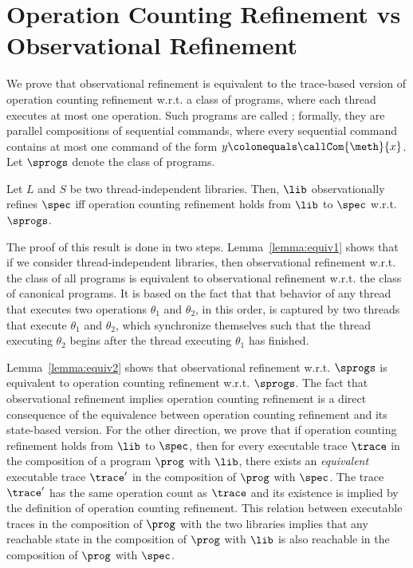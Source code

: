 
\section{Operation Counting Refinement vs Observational Refinement}
\label{sec:equiv}

We prove that observational refinement is equivalent to the trace-based version of operation counting refinement w.r.t. a class of programs, 
where each thread executes at most one operation. Such programs are called \emph{\simple}; formally, they are parallel compositions of 
sequential commands, where every sequential command contains at most one command of the form $y \colonequals \callCom{\meth}{x}$.
Let $\sprogs$ denote the class of {\simple} programs. 

\begin{theorem}\label{prop:count}
Let $L$ and $S$ be two thread-independent libraries. %
Then, $\lib$ observationally refines $\spec$ iff operation counting refinement holds from $\lib$ to $\spec$ w.r.t. $\sprogs$.
\end{theorem}

The proof of this result is done in two steps. Lemma~\ref{lemma:equiv1} shows that if we consider thread-independent libraries, 
then observational refinement w.r.t. the class of all programs is equivalent to observational refinement w.r.t. the class of canonical 
programs. It is based on the fact that that behavior of any thread that executes two operations $\theta_1$ and $\theta_2$, in this order,
is captured by two threads that execute $\theta_1$ and \resp $\theta_2$, which synchronize themselves such that the 
thread executing $\theta_2$ begins after the thread executing $\theta_1$ has finished. 

Lemma~\ref{lemma:equiv2} shows that observational refinement w.r.t. $\sprogs$ is equivalent to operation counting refinement w.r.t. $\sprogs$.
The fact that observational refinement implies operation counting refinement  is a direct consequence of the equivalence between 
operation counting refinement and its state-based version. For the other direction, we prove that if operation counting refinement
holds from $\lib$ to $\spec$, then for every executable trace $\trace$ in the composition of a program $\prog$ with $\lib$, %
there exists an \emph{equivalent} executable trace $\trace'$ in the composition of $\prog$ with $\spec$. The trace $\trace'$ has the
same operation count as $\trace$ and its existence is implied by the definition of operation counting refinement.
This relation between executable traces in the composition of $\prog$ with the two libraries implies that any reachable state
in the composition of $\prog$ with $\lib$ is also reachable in the composition of $\prog$ with $\spec$.

